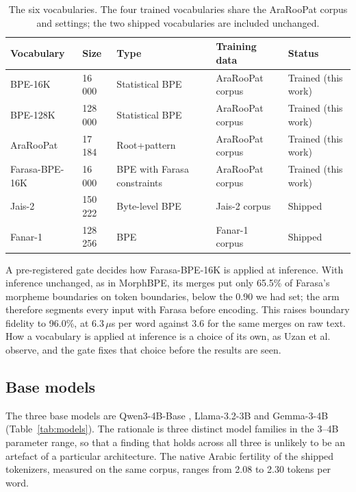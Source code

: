 \documentclass[a4paper,fleqn]{cas-sc}
\begin{document}
\begin{table}[t]
\centering
\caption{The six vocabularies. The four trained vocabularies share the AraRooPat corpus and settings; the two shipped vocabularies are included unchanged.}
\label{tab:vocab}
\begin{tabular}{@{}lllll@{}}
\toprule
Vocabulary & Size & Type & Training data & Status \\
\midrule
BPE-16K & 16\,000 & Statistical BPE & AraRooPat corpus & Trained (this work) \\
BPE-128K & 128\,000 & Statistical BPE & AraRooPat corpus & Trained (this work) \\
AraRooPat & 17\,184 & Root+pattern & AraRooPat corpus & Trained (this work) \\
Farasa-BPE-16K & 16\,000 & BPE with Farasa constraints & AraRooPat corpus & Trained (this work) \\
Jais-2 & 150\,222 & Byte-level BPE & Jais-2 corpus & Shipped \\
Fanar-1 & 128\,256 & BPE & Fanar-1 corpus & Shipped \\
\bottomrule
\end{tabular}
\end{table}

A pre-registered gate decides how Farasa-BPE-16K is applied at inference. With inference unchanged, as in MorphBPE, its merges put only 65.5\% of Farasa's morpheme boundaries on token boundaries, below the 0.90 we had set; the arm therefore segments every input with Farasa before encoding. This raises boundary fidelity to 96.0\%, at 6.3\,$\mu$s per word against 3.6 for the same merges on raw text. How a vocabulary is applied at inference is a choice of its own, as Uzan et al.\ \citep{uzan2024greed} observe, and the gate fixes that choice before the results are seen.

\subsection{Base models}
\label{sec:protocol:models}

The three base models are Qwen3-4B-Base \citep{yang2025qwen3}, Llama-3.2-3B \citep{grattafiori2024llama3} and Gemma-3-4B \citep{gemma2025} (Table~\ref{tab:models}). The rationale is three distinct model families in the 3--4B parameter range, so that a finding that holds across all three is unlikely to be an artefact of a particular architecture. The native Arabic fertility of the shipped tokenizers, measured on the same corpus, ranges from 2.08 to 2.30 tokens per word.
\end{document}
